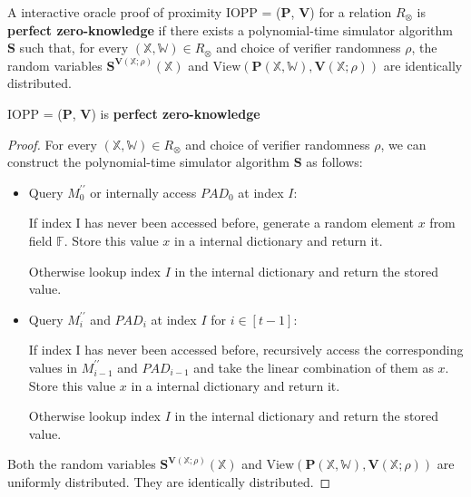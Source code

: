 \begin{definition}

A interactive oracle proof of proximity IOPP = ($\textbf{P}$, $\textbf{V}$) for a relation $R_\otimes$ is \textbf{perfect zero-knowledge} if there exists a polynomial-time simulator algorithm $\textbf{S}$ such that, for every $(\mathbb{X}, \mathbb{W}) \in R_\otimes$ and choice of verifier randomness $\rho$, the random variables $\textbf{S}^{\textbf{V}(\mathbb{X};\rho)}(\mathbb{X})$ and $\text{View}(\textbf{P}(\mathbb{X}, \mathbb{W}), \textbf{V}(\mathbb{X};\rho))$ are identically distributed.
 
\end{definition}

\begin{lemma}
\label{lemma:szkpc-zk}

IOPP = ($\textbf{P}$, $\textbf{V}$) is \textbf{perfect zero-knowledge}

\end{lemma}
\begin{proof}

For every $(\mathbb{X}, \mathbb{W}) \in R_\otimes$ and choice of verifier randomness $\rho$, we can construct the polynomial-time simulator algorithm $\textbf{S}$ as follows:

\begin{itemize}
    \item Query $M_0^{\prime\prime}$ or internally access $PAD_0$ at index $I$:
    
    If index I has never been accessed before, generate a random element $x$ from field $\mathbb{F}$. Store this value $x$ in a internal dictionary and return it.
    
    Otherwise lookup index $I$ in the internal dictionary and return the stored value.
    
    \item Query $M_i^{\prime\prime}$ and $PAD_i$ at index $I$ for $i \in [t-1]$:

    If index I has never been accessed before, recursively access the corresponding values in $M_{i-1}^{\prime\prime}$ and $PAD_{i-1}$ and take the linear combination of them as $x$.
    Store this value $x$ in a internal dictionary and return it.
    
    Otherwise lookup index $I$ in the internal dictionary and return the stored value.    
    
\end{itemize}

Both the random variables $\textbf{S}^{\textbf{V}(\mathbb{X};\rho)}(\mathbb{X})$ and $\text{View}(\textbf{P}(\mathbb{X}, \mathbb{W}), \textbf{V}(\mathbb{X};\rho))$ are uniformly distributed. They are identically distributed.

\end{proof}